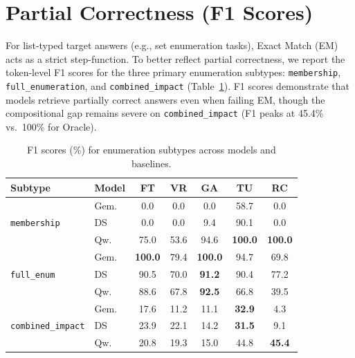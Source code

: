 \section{Partial Correctness (F1 Scores)}
\label{app:f1-scores}

For list-typed target answers (e.g., set enumeration tasks), Exact Match (EM) acts as a strict step-function. To better reflect partial correctness, we report the token-level F1 scores for the three primary enumeration subtypes: \texttt{membership}, \texttt{full\_enumeration}, and \texttt{combined\_impact} (Table~\ref{tab:f1-scores}). F1 scores demonstrate that models retrieve partially correct answers even when failing EM, though the compositional gap remains severe on \texttt{combined\_impact} (F1 peaks at 45.4\% vs.\ 100\% for Oracle).

\begin{table}[H]
\centering
\caption{F1 scores (\%) for enumeration subtypes across models and baselines.}
\label{tab:f1-scores}
\small
\begin{tabular}{@{}llccccc@{}}
\toprule
Subtype & Model & FT & VR & GA & TU & RC \\
\midrule
\multirow{3}{*}{\texttt{membership}} 
  & Gem. & 0.0 & 0.0 & 0.0 & 58.7 & 0.0 \\
  & DS   & 0.0 & 0.0 & 9.4 & 90.1 & 0.0 \\
  & Qw.  & 75.0 & 53.6 & 94.6 & \textbf{100.0} & \textbf{100.0} \\
\midrule
\multirow{3}{*}{\texttt{full\_enum}} 
  & Gem. & \textbf{100.0} & 79.4 & \textbf{100.0} & 94.7 & 69.8 \\
  & DS   & 90.5 & 70.0 & \textbf{91.2} & 90.4 & 77.2 \\
  & Qw.  & 88.6 & 67.8 & \textbf{92.5} & 66.8 & 39.5 \\
\midrule
\multirow{3}{*}{\texttt{combined\_impact}} 
  & Gem. & 17.6 & 11.2 & 11.1 & \textbf{32.9} & 4.3 \\
  & DS   & 23.9 & 22.1 & 14.2 & \textbf{31.5} & 9.1 \\
  & Qw.  & 20.8 & 19.3 & 15.0 & 44.8 & \textbf{45.4} \\
\bottomrule
\end{tabular}
\end{table}
